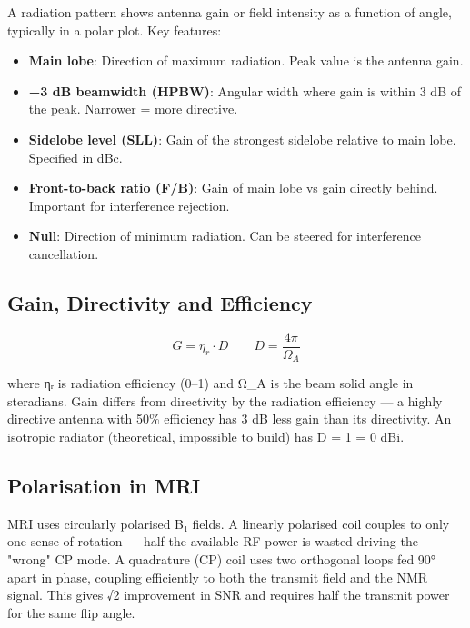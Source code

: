 A radiation pattern shows antenna gain or field intensity as a function of angle, typically in a polar plot. Key features:

      
\begin{itemize}

        \item \textbf{Main lobe}: Direction of maximum radiation. Peak value is the antenna gain.

        \item \textbf{−3 dB beamwidth (HPBW)}: Angular width where gain is within 3 dB of the peak. Narrower = more directive.

        \item \textbf{Sidelobe level (SLL)}: Gain of the strongest sidelobe relative to main lobe. Specified in dBc.

        \item \textbf{Front-to-back ratio (F/B)}: Gain of main lobe vs gain directly behind. Important for interference rejection.

        \item \textbf{Null}: Direction of minimum radiation. Can be steered for interference cancellation.

      
\end{itemize}

      

\subsection{Gain, Directivity and Efficiency}

      
\[G = \eta_r \cdot D \qquad D = \dfrac{4\pi}{\Omega_A}\]

      

where ηᵣ is radiation efficiency (0–1) and Ω\_A is the beam solid angle in steradians. Gain differs from directivity by the radiation efficiency — a highly directive antenna with 50\% efficiency has 3 dB less gain than its directivity. An isotropic radiator (theoretical, impossible to build) has D = 1 = 0 dBi.

      

\subsection{Polarisation in MRI}

      

MRI uses circularly polarised B₁ fields. A linearly polarised coil couples to only one sense of rotation — half the available RF power is wasted driving the "wrong" CP mode. A quadrature (CP) coil uses two orthogonal loops fed 90° apart in phase, coupling efficiently to both the transmit field and the NMR signal. This gives √2 improvement in SNR and requires half the transmit power for the same flip angle.



